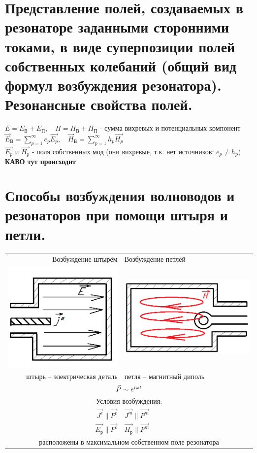 \begin{multicols*}{2}
		\section{Представление полей, создаваемых в резонаторе заданными сторонними токами, в виде суперпозиции полей собственных колебаний (общий вид формул возбуждения резонатора). Резонансные свойства полей.}

		$E = E_\text{В} + E_\text{П}, \quad H = H_\text{В} + H_\text{П}$ - сумма вихревых и потенциальных компонент\\
		${\vec{E}}_\text{В} = \sum\limits_{p = 1}^{\infty} e_p\vec{E_p}, \quad {\vec{H}}_\text{В} = \sum\limits_{p = 1}^{\infty} h_p\vec{H_p}$\\
		$\vec{E_p}$ и $\vec{H_p}$ - поля собственных мод (они вихревые, т.к. нет источников: $e_p \neq h_p$)
		\textbf{КАВО тут происходит}

		\section{Способы возбуждения волноводов и резонаторов при помощи штыря и петли.}
		
		\begin{tabular}{r || l}
			{Возбуждение штырём} & {Возбуждение петлёй} \\
			\includegraphics[width=0.25\linewidth]{aed_imgs/ask15_1} &
			\includegraphics[width=0.25\linewidth]{aed_imgs/ask15_2} \\
			{штырь – электрическая деталь} & {петля – магнитный диполь} \\
			\multicolumn{2}{c}{$\vec{P}\sim e^{i\omega t}$} \\
			\multicolumn{2}{c}{Условия возбуждения:} \\
			{$\vec{J^e} \parallel\vec{P^e}$} & {$\vec{J^m} \parallel\vec{P^m}$} \\
			{$\vec{E_\text{р}} \parallel\vec{P^e}$} & {$\vec{H_\text{р}}\parallel\vec{P^m}$} \\
			\multicolumn{2}{c}{расположены в максимальном собственном поле резонатора} \\
		\end{tabular}
		

\end{multicols*}
